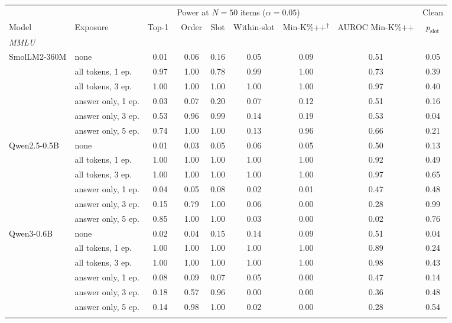 \begin{tabular}{llccccccc}
\toprule
 & & \multicolumn{5}{c}{Power at $N=50$ items ($\alpha=0.05$)} & & Clean\\
\cmidrule(lr){3-7}
Model & Exposure & Top-1~\cite{ni2025training} & Order & Slot & Within-slot & Min-K\%++$^\dagger$ & AUROC Min-K\%++ & $p_{\text{slot}}$\\
\midrule
\multicolumn{9}{l}{\textit{MMLU}}\\
SmolLM2-360M & none & 0.01 & 0.06 & 0.16 & 0.05 & 0.09 & 0.51 & 0.05\\
 & all tokens, 1 ep. & 0.97 & 1.00 & 0.78 & 0.99 & 1.00 & 0.73 & 0.39\\
 & all tokens, 3 ep. & 1.00 & 1.00 & 1.00 & 1.00 & 1.00 & 0.97 & 0.40\\
 & answer only, 1 ep. & 0.03 & 0.07 & 0.20 & 0.07 & 0.12 & 0.51 & 0.16\\
 & answer only, 3 ep. & 0.53 & 0.96 & 0.99 & 0.14 & 0.19 & 0.53 & 0.04\\
 & answer only, 5 ep. & 0.74 & 1.00 & 1.00 & 0.13 & 0.96 & 0.66 & 0.21\\
\addlinespace
Qwen2.5-0.5B & none & 0.01 & 0.03 & 0.05 & 0.06 & 0.05 & 0.50 & 0.13\\
 & all tokens, 1 ep. & 1.00 & 1.00 & 1.00 & 1.00 & 1.00 & 0.92 & 0.49\\
 & all tokens, 3 ep. & 1.00 & 1.00 & 1.00 & 1.00 & 1.00 & 0.97 & 0.65\\
 & answer only, 1 ep. & 0.04 & 0.05 & 0.08 & 0.02 & 0.01 & 0.47 & 0.48\\
 & answer only, 3 ep. & 0.15 & 0.79 & 1.00 & 0.06 & 0.00 & 0.28 & 0.99\\
 & answer only, 5 ep. & 0.85 & 1.00 & 1.00 & 0.03 & 0.00 & 0.02 & 0.76\\
\addlinespace
Qwen3-0.6B & none & 0.02 & 0.04 & 0.15 & 0.14 & 0.09 & 0.51 & 0.04\\
 & all tokens, 1 ep. & 1.00 & 1.00 & 1.00 & 1.00 & 1.00 & 0.89 & 0.24\\
 & all tokens, 3 ep. & 1.00 & 1.00 & 1.00 & 1.00 & 1.00 & 0.98 & 0.43\\
 & answer only, 1 ep. & 0.08 & 0.09 & 0.07 & 0.05 & 0.00 & 0.47 & 0.14\\
 & answer only, 3 ep. & 0.18 & 0.57 & 0.96 & 0.00 & 0.00 & 0.36 & 0.48\\
 & answer only, 5 ep. & 0.14 & 0.98 & 1.00 & 0.02 & 0.00 & 0.28 & 0.54\\
\addlinespace
\multicolumn{9}{l}{\textit{ARC-Challenge}}\\

\end{tabular}
